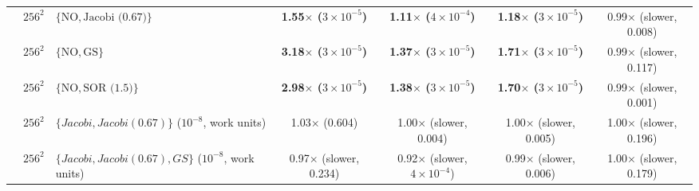 {\begin{tabular}{lllcccc}
 & $256^2$ & $\{\mathrm{NO}, \text{Jacobi (0.67)}\}$ & \textbf{1.55$\times$ ($3\times10^{-5}$)} & \textbf{1.11$\times$ ($4\times10^{-4}$)} & \textbf{1.18$\times$ ($3\times10^{-5}$)} & 0.99$\times$ (slower, 0.008) \\
 & $256^2$ & $\{\mathrm{NO}, \text{GS}\}$ & \textbf{3.18$\times$ ($3\times10^{-5}$)} & \textbf{1.37$\times$ ($3\times10^{-5}$)} & \textbf{1.71$\times$ ($3\times10^{-5}$)} & 0.99$\times$ (slower, 0.117) \\
 & $256^2$ & $\{\mathrm{NO}, \text{SOR (1.5)}\}$ & \textbf{2.98$\times$ ($3\times10^{-5}$)} & \textbf{1.38$\times$ ($3\times10^{-5}$)} & \textbf{1.70$\times$ ($3\times10^{-5}$)} & 0.99$\times$ (slower, 0.001) \\
 & $256^2$ & $\{Jacobi, Jacobi (0.67)\}$ ($10^{-8}$, work units) & 1.03$\times$ (0.604) & 1.00$\times$ (slower, 0.004) & 1.00$\times$ (slower, 0.005) & 1.00$\times$ (slower, 0.196) \\
 & $256^2$ & $\{Jacobi, Jacobi (0.67), GS\}$ ($10^{-8}$, work units) & 0.97$\times$ (slower, 0.234) & 0.92$\times$ (slower, $4\times10^{-4}$) & 0.99$\times$ (slower, 0.006) & 1.00$\times$ (slower, 0.179) \\
\bottomrule
\end{tabular}}
\newcommand{\caDiscMedMin}{3.2}
\newcommand{\caDiscMedMax}{17}
\newcommand{\caDiscMinHsq}{1.7}
\newcommand{\caDiscN}{400}
\newcommand{\caEnsVsPairMin}{\textbf{[pending]}}
\newcommand{\caEnsVsPairMax}{\textbf{[pending]}}
\newcommand{\caEnsVsSolverMin}{\textbf{[pending]}}
\newcommand{\caEnsVsSolverMax}{\textbf{[pending]}}
\newcommand{\caNumEns}{\textbf{[pending]}}
\newcommand{\caSpSolverBMin}{\textbf{[pending]}}
\newcommand{\caSpSolverBMax}{\textbf{[pending]}}
\newcommand{\caSpHintsBMin}{\textbf{[pending]}}
\newcommand{\caSpHintsBMax}{\textbf{[pending]}}
\newcommand{\caSpHintsTFBMin}{\textbf{[pending]}}
\newcommand{\caSpHintsTFBMax}{\textbf{[pending]}}
\newcommand{\caSpBestBMin}{\textbf{[pending]}}
\newcommand{\caSpBestBMax}{\textbf{[pending]}}
\newcommand{\caSpDecayBMin}{\textbf{[pending]}}
\newcommand{\caSpDecayBMax}{\textbf{[pending]}}
\newcommand{\caSpOneshotBMin}{\textbf{[pending]}}
\newcommand{\caSpOneshotBMax}{\textbf{[pending]}}
\newcommand{\caSpSolverDeepBMin}{\textbf{[pending]}}
\newcommand{\caSpSolverDeepBMax}{\textbf{[pending]}}
\newcommand{\caSpHintsDeepBMin}{\textbf{[pending]}}
\newcommand{\caSpHintsDeepBMax}{\textbf{[pending]}}
\newcommand{\caSpHintsTFDeepBMin}{\textbf{[pending]}}
\newcommand{\caSpHintsTFDeepBMax}{\textbf{[pending]}}
\newcommand{\caSpBestDeepBMin}{\textbf{[pending]}}
